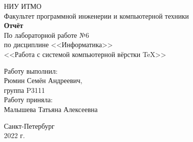 \newpage
\pagecolor[cmyk]{0,0,0,0}
\thispagestyle{empty}
\vspace*{1cm}
\begin{center}
\Large{НИУ ИТМО} \\
\vspace{1em}
\Large{Факультет программной инженерии и компьютерной техники}\\
\vspace{5em}
\Large{\textbf{Отчёт}\\
По лабораторной работе №6\\
по дисциплине <<Информатика>>\\
<<Работа с системой компьютерной вёрстки \TeX>>}
\end{center}

\vspace{25em}

\hfill\begin{minipage}{0.35\linewidth}
\begin{flushright}
\Large{Работу выполнил: \\
Рюмин Семён Андреевич, \\
группа P3111 \\
\vspace{1em}
Работу приняла: \\
Малышева Татьяна Алексеевна}
\end{flushright}
\end{minipage}

\vfill

\begin{center}
\Large{Санкт-Петербург \\2022 г.}
\end{center}

